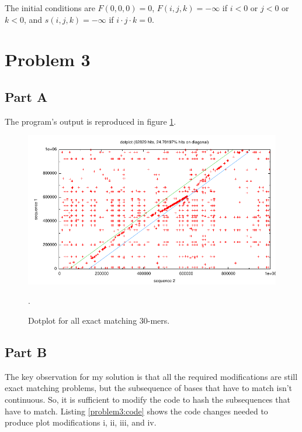 The initial conditions are $F(0, 0, 0) = 0$, $F(i, j, k) = -\infty$ if $i <
0$ or $j < 0$ or $k < 0$, and $s(i, j, k) = -\infty$ if $i \cdot j \cdot k = 0$.

\section{Problem 3}

\subsection{Part A}

The program's output is reproduced in figure \ref{problem3:exact30}.

\begin{figure}[htb]
  \includegraphics[width=6.8in]{6.878/ps1/figs/p3_exact30.pdf}
  \caption{Dotplot for all exact matching 30-mers.}
  \label{problem3:exact30}.
\end{figure}

\subsection{Part B}

The key observation for my solution is that all the required modifications are
still exact matching problems, but the subsequence of bases that have to match
isn't continuous. So, it is sufficient to modify the code to hash the
subsequences that have to match. Listing \ref{problem3:code} shows the
code changes needed to produce plot modifications i, ii, iii, and iv.

